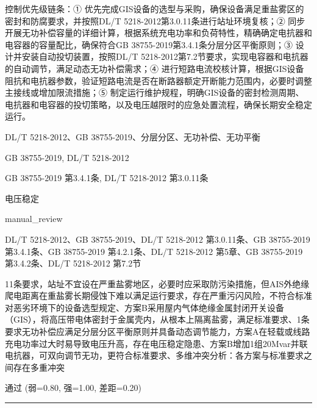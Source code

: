 \documentclass[11pt,a4paper]{ctexart}
\begin{document}
\begin{description}[leftmargin=1.5em,style=nextline,font=\normalfont]
控制优先级链条：① 优先完成GIS设备的选型与采购，确保设备满足重盐雾区的密封和防腐要求，并按照DL/T 5218-2012第3.0.11条进行站址环境复核；② 同步开展无功补偿容量的详细计算，根据系统充电功率和负荷特性，精确确定电抗器和电容器的容量配比，确保符合GB 38755-2019第3.4.1条分层分区平衡原则；③ 设计并安装自动投切装置，按照DL/T 5218-2012第7.2节要求，实现电容器和电抗器的自动调节，满足动态无功补偿需求；④ 进行短路电流校核计算，根据GIS设备阻抗和电抗器参数，验证短路电流是否在断路器额定开断能力范围内，必要时调整主接线或增加限流措施；⑤ 制定运行维护规程，明确GIS设备的密封检测周期、电抗器和电容器的投切策略，以及电压越限时的应急处置流程，确保长期安全稳定运行。
  \item[KW:] DL/T 5218-2012、GB 38755-2019、分层分区、无功补偿、无功平衡
  \item[标准:] GB 38755-2019, DL/T 5218-2012
  \item[条款溯源:] GB 38755-2019 第3.4.1条, DL/T 5218-2012 第3.0.11条
  \item[主题:] 电压稳定
  \item[评分方式:] manual\_review
  \item[Rubric条款:] DL/T 5218-2012、GB 38755-2019、DL/T 5218-2012 第3.0.11条、GB 38755-2019 第3.4.1条、GB 38755-2019 第4.2.1条、DL/T 5218-2012 第5章、GB 38755-2019 第3.4.2条、DL/T 5218-2012 第7.2节
  \item[Rubric判据:] 11条要求，站址不宜设在严重盐雾地区，必要时应采取防污染措施，但AIS外绝缘爬电距离在重盐雾长期侵蚀下难以满足运行要求，存在严重污闪风险，不符合标准对恶劣环境下的设备选型规定、方案B采用屋内气体绝缘金属封闭开关设备（GIS），将高压带电体密封于金属壳内，从根本上隔离盐雾，满足标准要求、1条要求无功补偿应满足分层分区平衡原则并具备动态调节能力，方案A在轻载或线路充电功率过大时易导致电压升高，存在电压稳定隐患、方案B增加1组20Mvar并联电抗器，可双向调节无功，更符合标准要求、多维冲突分析：各方案与标准要求之间存在多重冲突
  \item[LJ判定:] 通过 (弱=0.80, 强=1.00, 差距=0.20)
\end{description}
\vspace{4pt}
\hrule
\vspace{6pt}
\end{document}
